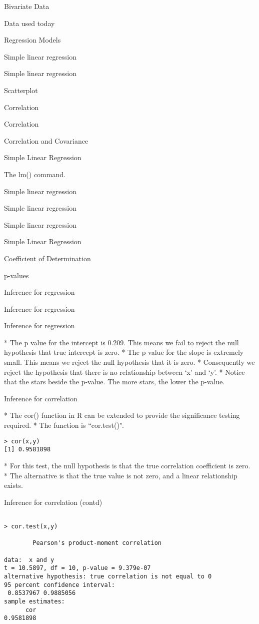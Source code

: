 \begin{slide}{Bivariate Data}
\begin{slide}{Data used today}
\begin{slide}{Regression Models}
\begin{slide}{Simple linear regression}
\begin{slide}{Simple linear regression}
\begin{slide}{Scatterplot}
\begin{slide}{Correlation}
\begin{slide}{Correlation}
\begin{slide}{Correlation and Covariance}
\begin{slide}{Simple Linear Regression}
\begin{slide}{The lm() command.}
\begin{slide}{Simple linear regression}
\begin{slide}{Simple linear regression}
\begin{slide}{Simple linear regression}
\begin{slide}{Simple Linear Regression}
\begin{slide}{Coefficient of Determination}
\begin{slide}{p-values}
\begin{slide}{Inference for regression}
\begin{slide}{Inference for regression}
\begin{slide}{Inference for regression}
\begin{itemize}
* The p value for the intercept is 0.209. This means we fail to reject the null hypothesis that true intercept is zero.
* The p value for the slope is extremely small. This means we reject the null hypothesis that it is zero.
* Consequently we reject the hypothesis that there is no relationship between `x' and `y'.
* Notice that the stars beside the p-value. The more stars, the lower the p-value.
\end{itemize}



\begin{slide}{Inference for correlation}
\begin{itemize}

* The cor() function in R can be extended to provide the significance testing required. 
* The function is ``cor.test()".
\begin{verbatim}
> cor(x,y)
[1] 0.9581898

\end{verbatim}
* For this test, the null hypothesis is that the true correlation coefficient is zero.
* The alternative is that the true value is not zero, and a linear relationship exists.
\end{itemize}



\begin{slide}{Inference for correlation (contd)}
\begin{verbatim}

> cor.test(x,y)

        Pearson's product-moment correlation

data:  x and y
t = 10.5897, df = 10, p-value = 9.379e-07
alternative hypothesis: true correlation is not equal to 0
95 percent confidence interval:
 0.8537967 0.9885056
sample estimates:
      cor
0.9581898 

\end{verbatim}



\end{slide}
\end{slide}
\end{slide}
\end{slide}
\end{slide}
\end{slide}
\end{slide}
\end{slide}
\end{slide}
\end{slide}
\end{slide}
\end{slide}
\end{slide}
\end{slide}
\end{slide}
\end{slide}
\end{slide}
\end{slide}
\end{slide}
\end{slide}
\end{slide}
\end{slide}
